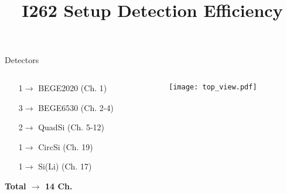 \documentclass[10pt]{beamer}
\title{\normalsize I262 Setup Detection Efficiency}
\institute{}
\author{}
\date{}
\begin{document}
\frame{\titlepage}

\begin{frame}{Detectors}
\begin{columns}
	\begin{column}{0.5\textwidth}
		\centering
		\begin{itemize}
			\item[1$\rightarrow$] BEGE2020 (Ch. 1)
			\item[3$\rightarrow$] BEGE6530 (Ch. 2-4)
			\item[2$\rightarrow$] QuadSi (Ch. 5-12)
			\item[1$\rightarrow$] CircSi (Ch. 19)
			\item[1$\rightarrow$] Si(Li) (Ch. 17)
		\end{itemize}
		\center
		\vspace{0.1\textheight}
		\hspace{-0.2\textwidth}
		\textbf{\color{red} Total $\rightarrow$ 14 Ch.}
	\end{column}
	\begin{column}{0.5\textwidth}
		\centering
		\texttt{[image: top\_view.pdf]}\\
	\end{column}
\end{columns}
\end{frame}
\end{document}
